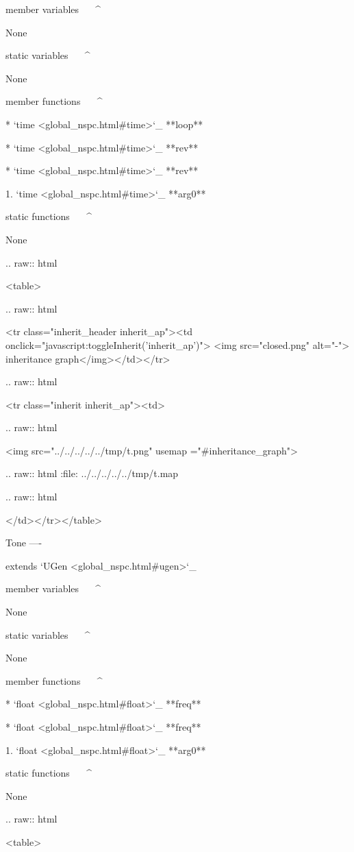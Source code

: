 member variables
^^^^^^^^^^^^^^^^

	None

static variables
^^^^^^^^^^^^^^^^

	None

member functions
^^^^^^^^^^^^^^^^

	* `time <global_nspc.html#time>`_ **loop**

	* `time <global_nspc.html#time>`_ **rev**

	* `time <global_nspc.html#time>`_ **rev**

		1. `time <global_nspc.html#time>`_ **arg0**

static functions
^^^^^^^^^^^^^^^^


	None


  .. raw:: html

   <table>


  .. raw:: html

   <tr class="inherit_header inherit_ap"><td onclick="javascript:toggleInherit('inherit_ap')"> <img src="closed.png" alt="-"> inheritance graph</img></td></tr>


  .. raw:: html

   <tr class="inherit inherit_ap"><td>


  .. raw:: html

   <img src="../../../../../tmp/t.png" usemap ="#inheritance_graph">


  .. raw:: html
   :file:   ../../../../../tmp/t.map


  .. raw:: html

   </td></tr></table>

Tone
----

extends `UGen <global_nspc.html#ugen>`_ 

member variables
^^^^^^^^^^^^^^^^

	None

static variables
^^^^^^^^^^^^^^^^

	None

member functions
^^^^^^^^^^^^^^^^

	* `float <global_nspc.html#float>`_ **freq**

	* `float <global_nspc.html#float>`_ **freq**

		1. `float <global_nspc.html#float>`_ **arg0**

static functions
^^^^^^^^^^^^^^^^


	None


  .. raw:: html

   <table>


